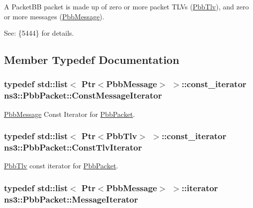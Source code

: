 A Packet\+BB packet is made up of zero or more packet T\+L\+Vs (\hyperlink{classns3_1_1PbbTlv}{Pbb\+Tlv}), and zero or more messages (\hyperlink{classns3_1_1PbbMessage}{Pbb\+Message}).

See\+: \{5444\} for details. 

\subsection{Member Typedef Documentation}
\subsubsection[{\texorpdfstring{Const\+Message\+Iterator}{ConstMessageIterator}}]{\setlength{\rightskip}{0pt plus 5cm}typedef {\bf std\+::list}$<$ {\bf Ptr}$<${\bf Pbb\+Message}$>$ $>$\+::const\+\_\+iterator {\bf ns3\+::\+Pbb\+Packet\+::\+Const\+Message\+Iterator}}\hypertarget{classns3_1_1PbbPacket_a59b58a11ce8de2cc2ff3c7fd7c4f1d10}{}\label{classns3_1_1PbbPacket_a59b58a11ce8de2cc2ff3c7fd7c4f1d10}


\hyperlink{classns3_1_1PbbMessage}{Pbb\+Message} Const Iterator for \hyperlink{classns3_1_1PbbPacket}{Pbb\+Packet}. 

\subsubsection[{\texorpdfstring{Const\+Tlv\+Iterator}{ConstTlvIterator}}]{\setlength{\rightskip}{0pt plus 5cm}typedef {\bf std\+::list}$<$ {\bf Ptr}$<${\bf Pbb\+Tlv}$>$ $>$\+::const\+\_\+iterator {\bf ns3\+::\+Pbb\+Packet\+::\+Const\+Tlv\+Iterator}}\hypertarget{classns3_1_1PbbPacket_af4ade92b0fd19f31c07ad2cd0303ed21}{}\label{classns3_1_1PbbPacket_af4ade92b0fd19f31c07ad2cd0303ed21}


\hyperlink{classns3_1_1PbbTlv}{Pbb\+Tlv} const iterator for \hyperlink{classns3_1_1PbbPacket}{Pbb\+Packet}. 

\subsubsection[{\texorpdfstring{Message\+Iterator}{MessageIterator}}]{\setlength{\rightskip}{0pt plus 5cm}typedef {\bf std\+::list}$<$ {\bf Ptr}$<${\bf Pbb\+Message}$>$ $>$\+::iterator {\bf ns3\+::\+Pbb\+Packet\+::\+Message\+Iterator}}\hypertarget{classns3_1_1PbbPacket_a5fed659b1aebf8573c8f3aebe41e6013}{}\label{classns3_1_1PbbPacket_a5fed659b1aebf8573c8f3aebe41e6013}



